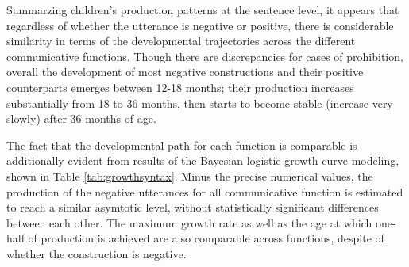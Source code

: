 \documentclass[
  english,
  man,floatsintext]{apa6}
\begin{document}
Summarzing children's production patterns at the sentence level, it appears that regardless of whether the utterance is negative or positive, there is considerable similarity in terms of the developmental trajectories across the different communicative functions. Though there are discrepancies for cases of prohibition, overall the development of most negative constructions and their positive counterparts emerges between 12-18 months; their production increases substantially from 18 to 36 months, then starts to become stable (increase very slowly) after 36 months of age.

The fact that the developmental path for each function is comparable is additionally evident from results of the Bayesian logistic growth curve modeling, shown in Table \ref{tab:growthsyntax}. Minus the precise numerical values, the production of the negative utterances for all communicative function is estimated to reach a similar asymtotic level, without statistically significant differences between each other. The maximum growth rate as well as the age at which one-half of production is achieved are also comparable across functions, despite of whether the construction is negative.
\end{document}
